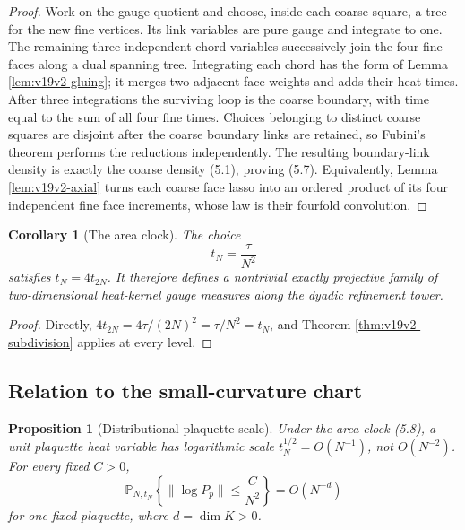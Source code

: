\documentclass[11pt]{article}
\newtheorem{proposition}[theorem]{Proposition}
\newtheorem{corollary}[theorem]{Corollary}
\theoremstyle{remark}
\begin{document}
\begin{proof}
Work on the gauge quotient and choose, inside each coarse square, a tree
for the new fine vertices.  Its link variables are pure gauge and integrate
to one.  The remaining three independent chord variables successively join
the four fine faces along a dual spanning tree.  Integrating each chord has
the form of Lemma \ref{lem:v19v2-gluing}; it merges two adjacent face
weights and adds their heat times.  After three integrations the surviving
loop is the coarse boundary, with time equal to the sum of all four fine
times.  Choices belonging to distinct coarse squares are disjoint after the
coarse boundary links are retained, so Fubini's theorem performs the
reductions independently.  The resulting boundary-link density is exactly
the coarse density (5.1), proving (5.7).  Equivalently, Lemma
\ref{lem:v19v2-axial} turns each coarse face lasso into an ordered product
of its four independent fine face increments, whose law is their fourfold
convolution.
\end{proof}

\begin{corollary}[The area clock]
\label{cor:v19v2-area-clock}
The choice
\[
 t_N=\frac{\tau}{N^2}                                     \tag{5.8}
\]
satisfies \(t_N=4t_{2N}\).  It therefore defines a nontrivial exactly
projective family of two-dimensional heat-kernel gauge measures along the
dyadic refinement tower.
\end{corollary}

\begin{proof}
Directly,
\(4t_{2N}=4\tau/(2N)^2=\tau/N^2=t_N\), and Theorem
\ref{thm:v19v2-subdivision} applies at every level.
\end{proof}

\subsection{Relation to the small-curvature chart}

\begin{proposition}[Distributional plaquette scale]
\label{prop:v19v2-rough-scale}
Under the area clock (5.8), a unit plaquette heat variable has logarithmic
scale \(t_N^{1/2}=O(N^{-1})\), not \(O(N^{-2})\).  For every fixed \(C>0\),
\[
 {\mathbb P}_{N,t_N}
 \left\{\|\log P_p\|\le\frac{C}{N^2}\right\}
 =O(N^{-d})                                                \tag{5.9}
\]
for one fixed plaquette, where \(d=\dim K>0\).
\end{proposition}
\end{document}
